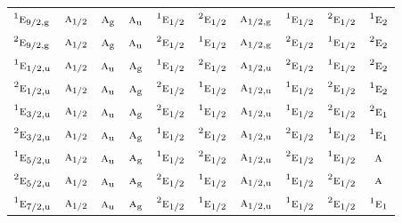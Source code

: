 \documentclass[10pt,a4paper]{article}
\numberwithin{equation}{section}
\newcommand{\irr}[1]{\text{\normalfont\scshape #1}}
\newcommand{\conjpair}[1]{{}^{#1}}
\newcommand{\ptag}[1]{\mathrm{#1}}
\begin{document}
{\begin{longtable}{@{}lccccccccc@{}}
$\conjpair{1}\irr{e}_{9/2,\ptag{g}}$ & $\irr{a}_{1/2}$ & $\irr{a}_{\ptag{g}}$ & $\irr{a}_{\ptag{u}}$ & $\conjpair{1}\irr{e}_{1/2}$ & $\conjpair{2}\irr{e}_{1/2}$ & $\irr{a}_{1/2,\ptag{g}}$ & $\conjpair{1}\irr{e}_{1/2}$ & $\conjpair{2}\irr{e}_{1/2}$ & $\conjpair{1}\irr{e}_{2}$\\
$\conjpair{2}\irr{e}_{9/2,\ptag{g}}$ & $\irr{a}_{1/2}$ & $\irr{a}_{\ptag{g}}$ & $\irr{a}_{\ptag{u}}$ & $\conjpair{2}\irr{e}_{1/2}$ & $\conjpair{1}\irr{e}_{1/2}$ & $\irr{a}_{1/2,\ptag{g}}$ & $\conjpair{2}\irr{e}_{1/2}$ & $\conjpair{1}\irr{e}_{1/2}$ & $\conjpair{2}\irr{e}_{2}$\\
$\conjpair{1}\irr{e}_{1/2,\ptag{u}}$ & $\irr{a}_{1/2}$ & $\irr{a}_{\ptag{u}}$ & $\irr{a}_{\ptag{g}}$ & $\conjpair{1}\irr{e}_{1/2}$ & $\conjpair{2}\irr{e}_{1/2}$ & $\irr{a}_{1/2,\ptag{u}}$ & $\conjpair{2}\irr{e}_{1/2}$ & $\conjpair{1}\irr{e}_{1/2}$ & $\conjpair{2}\irr{e}_{2}$\\
$\conjpair{2}\irr{e}_{1/2,\ptag{u}}$ & $\irr{a}_{1/2}$ & $\irr{a}_{\ptag{u}}$ & $\irr{a}_{\ptag{g}}$ & $\conjpair{2}\irr{e}_{1/2}$ & $\conjpair{1}\irr{e}_{1/2}$ & $\irr{a}_{1/2,\ptag{u}}$ & $\conjpair{1}\irr{e}_{1/2}$ & $\conjpair{2}\irr{e}_{1/2}$ & $\conjpair{1}\irr{e}_{2}$\\
$\conjpair{1}\irr{e}_{3/2,\ptag{u}}$ & $\irr{a}_{1/2}$ & $\irr{a}_{\ptag{u}}$ & $\irr{a}_{\ptag{g}}$ & $\conjpair{2}\irr{e}_{1/2}$ & $\conjpair{1}\irr{e}_{1/2}$ & $\irr{a}_{1/2,\ptag{u}}$ & $\conjpair{1}\irr{e}_{1/2}$ & $\conjpair{2}\irr{e}_{1/2}$ & $\conjpair{2}\irr{e}_{1}$\\
$\conjpair{2}\irr{e}_{3/2,\ptag{u}}$ & $\irr{a}_{1/2}$ & $\irr{a}_{\ptag{u}}$ & $\irr{a}_{\ptag{g}}$ & $\conjpair{1}\irr{e}_{1/2}$ & $\conjpair{2}\irr{e}_{1/2}$ & $\irr{a}_{1/2,\ptag{u}}$ & $\conjpair{2}\irr{e}_{1/2}$ & $\conjpair{1}\irr{e}_{1/2}$ & $\conjpair{1}\irr{e}_{1}$\\
$\conjpair{1}\irr{e}_{5/2,\ptag{u}}$ & $\irr{a}_{1/2}$ & $\irr{a}_{\ptag{u}}$ & $\irr{a}_{\ptag{g}}$ & $\conjpair{1}\irr{e}_{1/2}$ & $\conjpair{2}\irr{e}_{1/2}$ & $\irr{a}_{1/2,\ptag{u}}$ & $\conjpair{2}\irr{e}_{1/2}$ & $\conjpair{1}\irr{e}_{1/2}$ & $\irr{a}$\\
$\conjpair{2}\irr{e}_{5/2,\ptag{u}}$ & $\irr{a}_{1/2}$ & $\irr{a}_{\ptag{u}}$ & $\irr{a}_{\ptag{g}}$ & $\conjpair{2}\irr{e}_{1/2}$ & $\conjpair{1}\irr{e}_{1/2}$ & $\irr{a}_{1/2,\ptag{u}}$ & $\conjpair{1}\irr{e}_{1/2}$ & $\conjpair{2}\irr{e}_{1/2}$ & $\irr{a}$\\
$\conjpair{1}\irr{e}_{7/2,\ptag{u}}$ & $\irr{a}_{1/2}$ & $\irr{a}_{\ptag{u}}$ & $\irr{a}_{\ptag{g}}$ & $\conjpair{2}\irr{e}_{1/2}$ & $\conjpair{1}\irr{e}_{1/2}$ & $\irr{a}_{1/2,\ptag{u}}$ & $\conjpair{1}\irr{e}_{1/2}$ & $\conjpair{2}\irr{e}_{1/2}$ & $\conjpair{1}\irr{e}_{1}$\\

\end{longtable}}
\end{document}
